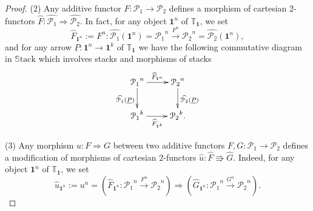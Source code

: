 \documentclass[11pt]{amsart}
\newcommand{\cP}{\mathcal{P}}
\newcommand{\STACK}{\mathbb{S}\mathrm{tack}}
\newcommand{\bfu}{\textbf{1}}
\newcommand{\twoT}{\mathbb{T}}
\theoremstyle{definition}
\numberwithin{equation}{section}
\begin{document}
\begin{proof}
	(2) Any additive functor $F: \cP_1 \to \cP_2$ defines a morphism of cartesian 2-functors 
	$\widehat{F}: \widehat{\cP_1} \Rightarrow  \widehat{\cP_2}$. In fact,
	for any object $\bfu^n$  of $\twoT_\bfu$, we set 
	\begin{equation}\label{eq:F^1}
 \widehat{F}_{\bfu^n}:=F^n: \widehat{\cP_1}(\bfu^n)= {\cP_1}^n  \stackrel{F^n}{\longrightarrow} {\cP_2}^n =\widehat{\cP_2}(\bfu^n),
	\end{equation}
	and for any arrow $\underline{P}:\bfu^n \to \bfu^k$ of $\twoT_\bfu$ we have the following commutative diagram in $\STACK$ which involves stacks and  morphisms of stacks
\begin{equation*}
	\begin{tabular}{c}
		\xymatrix{ {\cP_1}^n \ar[r]^{\widehat{F}_{\bfu^n}} \ar[d]_{\widehat{\cP_1}(\underline{P})} & {\cP_2}^n \ar[d]^{\widehat{\cP_2}(\underline{P})}\\  {\cP_1}^k \ar[r]_{\widehat{F}_{\bfu^k}} & {\cP_2}^k.}
	\end{tabular}
\end{equation*}
	

(3)	 Any morphism $u: F \Rightarrow G$ between two additive functors $F,G: \cP_1 \to \cP_2$ defines a modification of morphisms of cartesian 2-functors 
	$ \widehat{u}: \widehat{F} \Rrightarrow \widehat{G}$.
	Indeed, for any object $\bfu^n$ of $\twoT_\bfu$, we set 
	 $$\widehat{u}_{\bfu^n}:=u^n= (\widehat{F}_{\bfu^n}: {\cP_1}^n  \stackrel{F^n}{\rightarrow} {\cP_2}^n) \Longrightarrow  (\widehat{G}_{\bfu^n}: {\cP_1}^n  \stackrel{G^n}{\rightarrow} {\cP_2}^n) .$$ 



\end{proof}
\end{document}
